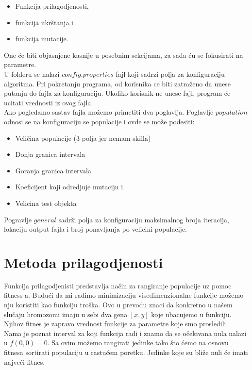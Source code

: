 \documentclass[a4paper,11pt]{book}
\begin{document}
\begin{itemize}
  \item Funkcija prilagodjenosti,
  \item funkcija ukrštanja i
  \item funkcija mutacije. 
\end{itemize}

One će biti objasnjene kasnije u posebnim sekcijama, za sada ću se fokusirati na parametre.\\

U folderu se nalazi $config.properties$ fajl koji sadrzi polja za konfiguraciju algoritma. Pri pokretanju programa, od korisnika ce biti zatraženo da unese putanju do fajla za konfiguraciju. Ukoliko korisnik ne unese fajl, program će ucitati vrednosti iz ovog fajla. \\

Ako pogledamo sastav fajla možemo primetiti dva poglavlja. Poglavlje $population$ odnosi se na konfiguraciju se populacije i ovde se može podesiti:

\begin{itemize}
  \item Veličina populacije (3 polja jer nemam skilla)
  \item Donja granica intervala
  \item Goranja granica intervala
  \item Koeficijent koji odredjuje mutaciju i 
  \item Velicina test objekta
\end{itemize}
 
Pogravlje $general$ sadrži polja za konfiguraciju maksimalnog broja iteracija, lokaciju output fajla i broj ponavljanja po velicini populacije.

\section{Metoda prilagodjenosti}

Funkcija prilagodjenisti predstavlja način za rangiranje populacije uz pomoc fitness-a. Budući da mi radimo minimizaciju visedimenzionalne funkcije možemo nju koristiti kao funkciju troška. Ovo u prevodu znaci da konkretno u našem slučaju hromozomi imaju u sebi dva gena $[x,y]$ koje ubacujemo u funkciju. Njihov fitnes je zapravo vrednost funkcije za parametre koje smo prosledili.\\

Nama je poznat interval za koji funkcija radi i znamo da se očekivana nula nalazi u $f(0,0)=0$. Sa ovim možemo rangirati jedinke tako što ćemo na osnovu fitnesa sortirati populaciju u rastućem poretku. Jedinke koje su bliže nuli će imati najveći fitnes.
\end{document}
